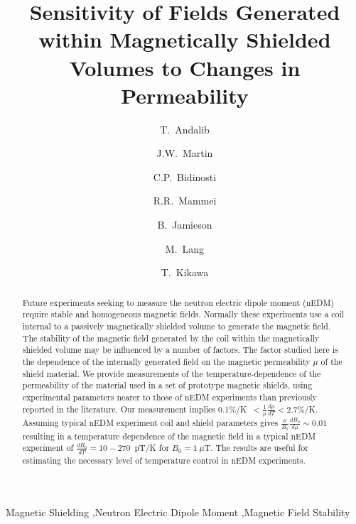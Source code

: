 \documentclass[review,number,sort&compress]{elsarticle}
\begin{document}
\begin{frontmatter}

\title{Sensitivity of Fields Generated within Magnetically Shielded
  Volumes to Changes in Permeability}

\author[manitoba]{T.~Andalib}
\author[winnipeg,manitoba]{J.W.~Martin}
\author[winnipeg,manitoba]{C.P.~Bidinosti}
\author[winnipeg,manitoba]{R.R.~Mammei}
\author[winnipeg,manitoba]{B.~Jamieson}
\author[manitoba]{M.~Lang}
\author[triumf]{T.~Kikawa}


\address[winnipeg]{Physics Department, The University of Winnipeg, 515 Portage Avenue, Winnipeg, MB, R3B 2E9, Canada}
\address[manitoba]{Department of Physics and Astronomy, University of Manitoba, Winnipeg, MB R3T 2N2, Canada}
\address[triumf]{TRIUMF, 4004 Wesbrook Mall, Vancouver, BC V6T 2A3, Canada}


\begin{abstract}
Future experiments seeking to measure the neutron electric dipole
moment (nEDM) require stable and homogeneous magnetic fields.
Normally these experiments use a coil internal to a passively
magnetically shielded volume to generate the magnetic field.  The
stability of the magnetic field generated by the coil within the
magnetically shielded volume may be influenced by a number of factors.
The factor studied here is the dependence of the internally generated
field on the magnetic permeability $\mu$ of the shield material.  We
provide measurements of the temperature-dependence of the permeability
of the material used in a set of prototype magnetic shields, using
experimental parameters nearer to those of nEDM experiments than
previously reported in the literature.  Our measurement implies
0.1\%/K~$<\frac{1}{\mu}\frac{d\mu}{dT}<2.7$\%/K. Assuming typical nEDM
experiment coil and shield parameters gives
$\frac{\mu}{B_0}\frac{dB_0}{d\mu}\sim 0.01$ resulting in a temperature
dependence of the magnetic field in a typical nEDM experiment of
$\frac{dB_0}{dT}=10-270$~pT/K for $B_0=1~\mu$T.  The results are
useful for estimating the necessary level of temperature control in
nEDM experiments.
\end{abstract}

\begin{keyword}
Magnetic Shielding \sep Neutron Electric Dipole Moment \sep Magnetic Field Stability
\end{keyword}

\end{frontmatter}
\end{document}

